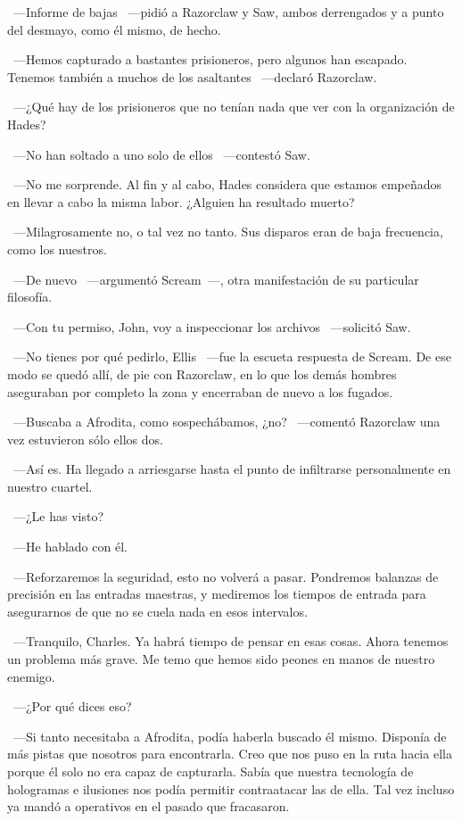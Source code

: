~---Informe de bajas ~---pidió a Razorclaw y Saw, ambos derrengados y a punto del desmayo, como él mismo, de hecho.

~---Hemos capturado a bastantes prisioneros, pero algunos han escapado. Tenemos también a muchos de los asaltantes ~---declaró Razorclaw.

~---¿Qué hay de los prisioneros que no tenían nada que ver con la organización de Hades?

~---No han soltado a uno solo de ellos ~---contestó Saw.

~---No me sorprende. Al fin y al cabo, Hades considera que estamos empeñados en llevar a cabo la misma labor. ¿Alguien ha resultado muerto?

~---Milagrosamente no, o tal vez no tanto. Sus disparos eran de baja frecuencia, como los nuestros.

~---De nuevo ~---argumentó Scream~---, otra manifestación de su particular filosofía.

~---Con tu permiso, John, voy a inspeccionar los archivos ~---solicitó Saw.

~---No tienes por qué pedirlo, Ellis ~---fue la escueta respuesta de Scream. De ese modo se quedó allí, de pie con Razorclaw, en lo que los demás hombres aseguraban por completo la zona y encerraban de nuevo a los fugados.

~---Buscaba a Afrodita, como sospechábamos, ¿no? ~---comentó Razorclaw una vez estuvieron sólo ellos dos.

~---Así es. Ha llegado a arriesgarse hasta el punto de infiltrarse personalmente en nuestro cuartel.

~---¿Le has visto?

~---He hablado con él.

~---Reforzaremos la seguridad, esto no volverá a pasar. Pondremos balanzas de precisión en las entradas maestras, y mediremos los tiempos de entrada para asegurarnos de que no se cuela nada en esos intervalos.

~---Tranquilo, Charles. Ya habrá tiempo de pensar en esas cosas. Ahora tenemos un problema más grave. Me temo que hemos sido peones en manos de nuestro enemigo.

~---¿Por qué dices eso?

~---Si tanto necesitaba a Afrodita, podía haberla buscado él mismo. Disponía de más pistas que nosotros para encontrarla. Creo que nos puso en la ruta hacia ella porque él solo no era capaz de capturarla. Sabía que nuestra tecnología de hologramas e ilusiones nos podía permitir contraatacar las de ella. Tal vez incluso ya mandó a operativos en el pasado que fracasaron.

